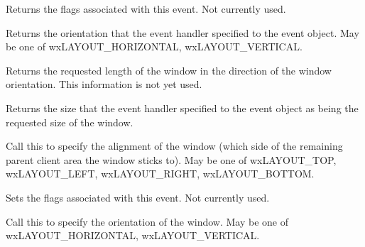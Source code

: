 \label{wxquerylayoutinfoeventgetflags}


Returns the flags associated with this event. Not currently used.

\label{wxquerylayoutinfoeventgetorientation}


Returns the orientation that the event handler specified to the event object. May be one of wxLAYOUT\_HORIZONTAL,
wxLAYOUT\_VERTICAL.

\label{wxquerylayoutinfoeventgetrequestedlength}


Returns the requested length of the window in the direction of the window orientation. This information
is not yet used.

\label{wxquerylayoutinfoeventgetsize}


Returns the size that the event handler specified to the event object as being the requested size of the window.

\label{wxquerylayoutinfoeventsetalignment}


Call this to specify the alignment of the window (which side of the remaining parent client area
the window sticks to). May be one of wxLAYOUT\_TOP, wxLAYOUT\_LEFT, wxLAYOUT\_RIGHT, wxLAYOUT\_BOTTOM.

\label{wxquerylayoutinfoeventsetflags}


Sets the flags associated with this event. Not currently used.

\label{wxquerylayoutinfoeventsetorientation}


Call this to specify the orientation of the window. May be one of wxLAYOUT\_HORIZONTAL,
wxLAYOUT\_VERTICAL.

